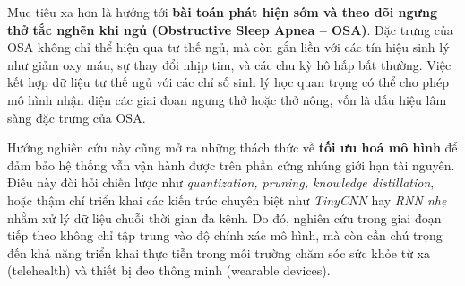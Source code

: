 Mục tiêu xa hơn là hướng tới \textbf{bài toán phát hiện sớm và theo dõi ngưng thở tắc nghẽn khi ngủ (Obstructive Sleep Apnea – OSA)}. 
Đặc trưng của OSA không chỉ thể hiện qua tư thế ngủ, mà còn gắn liền với các tín hiệu sinh lý như giảm oxy máu, 
sự thay đổi nhịp tim, và các chu kỳ hô hấp bất thường. 
Việc kết hợp dữ liệu tư thế ngủ với các chỉ số sinh lý học quan trọng có thể cho phép mô hình nhận diện 
các giai đoạn ngưng thở hoặc thở nông, vốn là dấu hiệu lâm sàng đặc trưng của OSA. 

Hướng nghiên cứu này cũng mở ra những thách thức về \textbf{tối ưu hoá mô hình} để đảm bảo hệ thống vẫn vận hành được 
trên phần cứng nhúng giới hạn tài nguyên. Điều này đòi hỏi chiến lược như \textit{quantization, pruning, knowledge distillation}, 
hoặc thậm chí triển khai các kiến trúc chuyên biệt như \textit{TinyCNN} hay \textit{RNN nhẹ} nhằm xử lý dữ liệu chuỗi thời gian đa kênh. 
Do đó, nghiên cứu trong giai đoạn tiếp theo không chỉ tập trung vào độ chính xác mô hình, 
mà còn cần chú trọng đến khả năng triển khai thực tiễn trong môi trường chăm sóc sức khỏe từ xa (telehealth) và thiết bị đeo thông minh (wearable devices).